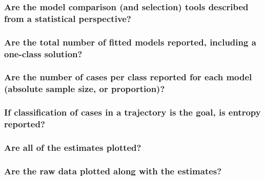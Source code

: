 \documentclass[
  english,
  man]{apa6}
\begin{document}
\hypertarget{are-the-model-comparison-and-selection-tools-described-from-a-statistical-perspective}{%
\subsubsection{Are the model comparison (and selection) tools described from a statistical perspective?}\label{are-the-model-comparison-and-selection-tools-described-from-a-statistical-perspective}}

\hypertarget{are-the-total-number-of-fitted-models-reported-including-a-one-class-solution}{%
\subsubsection{Are the total number of fitted models reported, including a one-class solution?}\label{are-the-total-number-of-fitted-models-reported-including-a-one-class-solution}}

\hypertarget{are-the-number-of-cases-per-class-reported-for-each-model-absolute-sample-size-or-proportion}{%
\subsubsection{Are the number of cases per class reported for each model (absolute sample size, or proportion)?}\label{are-the-number-of-cases-per-class-reported-for-each-model-absolute-sample-size-or-proportion}}

\hypertarget{if-classification-of-cases-in-a-trajectory-is-the-goal-is-entropy-reported}{%
\subsubsection{If classification of cases in a trajectory is the goal, is entropy reported?}\label{if-classification-of-cases-in-a-trajectory-is-the-goal-is-entropy-reported}}

\hypertarget{are-all-of-the-estimates-plotted}{%
\subsubsection{Are all of the estimates plotted?}\label{are-all-of-the-estimates-plotted}}

\hypertarget{are-the-raw-data-plotted-along-with-the-estimates}{%
\subsubsection{Are the raw data plotted along with the estimates?}\label{are-the-raw-data-plotted-along-with-the-estimates}}
\end{document}
